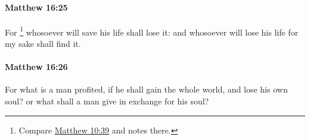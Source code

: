 		\paragraph{Matthew 16:25} %
			\label{MATTHEW-16-25}

			For
				\footnote{%
					Compare \hyperref[MATTHEW-10-39]{Matthew 10:39} and notes there.
					}%
			whosoever will save his life shall lose it: and whosoever will lose his life for my sake shall find it.

			\begin{framed}
			\scriptsize
				\begin{compactdesc}
					\item[SBLG]  \hyperref[PSUCHE]{}  \hyperref[PSUCHE]{} 
				\end{compactdesc}
			\end{framed}

		\paragraph{Matthew 16:26} %
			\label{MATTHEW-16-26}

			For what is a man profited, if he shall gain the whole world, and lose his own soul? or what shall a man give in exchange for his soul?

